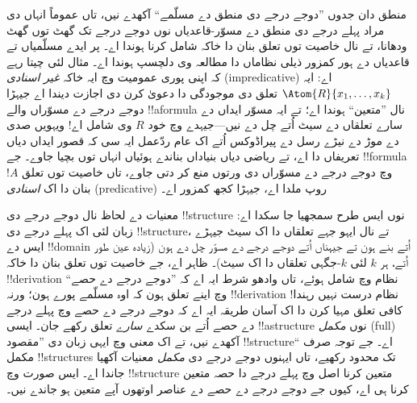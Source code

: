 \documentclass[../../../include/open-logic-section]{subfiles}
\begin{document}
منطق دان جدوں ”دوجے درجے دی منطق دے
مسلّمے“ آکھدے نیں، تاں عموماً انہاں دی مراد
پہلے درجے دی منطق دے مسوّر-قاعدیاں نوں
دوجے درجے تک گھٹ توں گھٹ ودھانا، تے نال
خاصیت توں تعلق بنان دا خاکہ شامل کرنا ہوندا
اے۔ پر ایدے مسلّمیاں تے قاعدیاں دے ہور
کمزور ذیلی نظاماں دا مطالعہ وی دلچسپ
ہوندا اے۔ مثال لئی چیتا رہے کہ اپنی پوری
عمومیت وچ ایہ خاکہ \emph{غیر اسنادی}
(impredicative) اے: ایہ
$\Atom{R}{x_1, \dots, x_k}$ تعلق دی موجودگی
دا دعویٰ کرن دی اجازت دیندا اے جیہڑا دوجے
درجے دے مسوّراں والے !!a{formula} نال
”متعین“ ہوندا اے؛ تے ایہ مسوّر ایداں دے
سارے تعلقاں دے سیٹ اُتے چل دے نیں---جیہدے
وچ خود $R$ وی شامل اے!{} ویہویں صدی دے
موڑ دے نیڑے رسل دے پیراڈوکس اُتے اک عام
ردّعمل ایہ سی کہ قصور ایداں دیاں تعریفاں
دا اے، تے ریاضی دیاں بنیاداں بناندے ہوئیاں
انہاں توں بچیا جاوے۔ جے
!!{formula}~$!A$ وچ دوجے درجے دے مسوّراں
دی ورتوں منع کر دتی جاوے، تاں خاصیت
توں تعلق بنان دا اک {\em اسنادی}
(predicative) روپ ملدا اے، جیہڑا کجھ
کمزور اے۔

معنیات دے لحاظ نال دوجے درجے دی
!!{structure} نوں ایس طرح سمجھیا جا سکدا
اے: زبان لئی اک پہلے درجے دی
!!{structure}، تے نال ایہو جہے تعلقاں دا
اک سیٹ جیہڑے ایس دے !!{domain} اُتے بنے
ہون تے جیہناں اُتے دوجے درجے دے مسوّر
چل دے ہون (زیادہ عین طور اُتے، ہر $k$
لئی $k$-جگہی تعلقاں دا اک سیٹ)۔
ظاہر اے، جے خاصیت توں تعلق بنان دا خاکہ
!!{derivation} نظام وچ شامل ہوئے، تاں وادھو
شرط ایہ اے کہ ”دوجے درجے دے حصے“ وچ
اینے تعلق ہون کہ اوہ مسلّمے پورے ہون؛
ورنہ !!{derivation} نظام درست نہیں رہندا!{}
کافی تعلق مہیا کرن دا اک آسان طریقہ ایہ
اے کہ دوجے درجے دے حصے وچ پہلے درجے دے
حصے اُتے بن سکدے \emph{سارے} تعلق رکھے
جان۔ ایسی !!a{structure} نوں
\emph{مکمل} (full) آکھدے نیں، تے اک معنی
وچ ایہی زبان دی ”مقصود !!{structure}“
اے۔ جے توجہ صرف مکمل !!{structure}s تک
محدود رکھیے، تاں ایہنوں دوجے درجے دی
\emph{مکمل} معنیات آکھیا جاندا اے۔
ایس صورت وچ !!{structure} متعین کرنا
اصل وچ پہلے درجے دا حصہ متعین کرنا ہی
اے، کیوں جے دوجے درجے دے حصے دے عناصر
اوتھوں آپے متعین ہو جاندے نیں۔
\end{document}
